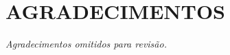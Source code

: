 \documentclass[10pt,conference]{IEEEtran}
\newif\iffinal
\begin{document}
\section*{\uppercase{Agradecimentos}}

\iffinal
    Os autores agradecem à Pontifícia Universidade Católica do Paraná~(PUCPR) pelo apoio e pela infraestrutura computacional do cluster CISIA, utilizada nos experimentos. %
\else
    \noindent\textit{Agradecimentos omitidos para revisão.}
    \vspace{2\baselineskip}
\fi




\end{document}
